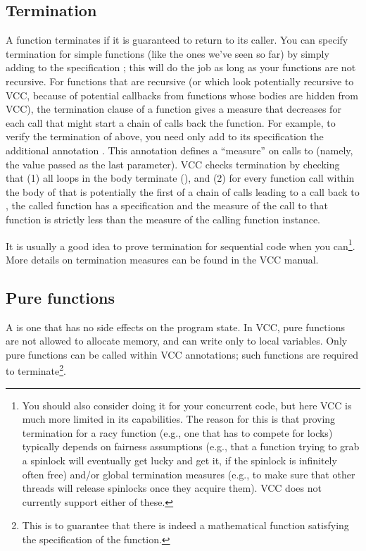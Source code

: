 \subsection{Termination}
\label{sect:termination}
A function terminates if it is guaranteed to return to its
caller. You can specify termination for simple functions (like the
ones we've seen so far) by simply adding to the specification
; this will do the job as long as your functions
are not recursive. For functions that are recursive (or which look
potentially recursive to VCC, because of potential callbacks from
functions whose bodies are hidden from VCC), the termination clause of
a function gives a measure that decreases for each call that might start
a chain of calls back the function. For example, to verify the
termination of  above, you need only add to its
specification the additional annotation . This
annotation defines a ``measure'' on calls to  (namely,
the value passed as the last parameter). VCC checks termination 
by checking that (1) all loops in the body terminate
(), and
(2) for every function call within the body of
 that is potentially the first of a chain of calls
leading to a call back to , the called function has a
 specification and the measure of the call to that
function is strictly less than the measure of the calling function
instance.  

It is usually a good idea to prove termination for sequential code
when you can\footnote{ You should also consider doing it for your
  concurrent code, but here VCC is much more limited in its
  capabilities. The reason for this is that proving termination for a
  racy function (e.g., one that has to compete for locks) typically
  depends on fairness assumptions (e.g., that a function trying to
  grab a spinlock will eventually get lucky and get it, if the
  spinlock is infinitely often free) and/or global termination
  measures (e.g., to make sure that other threads will release
  spinlocks once they acquire them). VCC does not currently support
  either of these.}.
More details on termination measures can be found in the VCC manual.

\subsection{Pure functions}
\label{sect:pureFunctions}
A  is one that has no side effects on the program
state. In VCC, pure functions are not allowed to allocate memory, and can
write only to local variables. Only pure functions can be called within VCC
annotations; such functions are required to terminate\footnote{
  This is to guarantee that there is indeed a mathematical function
  satisfying the specification of the function.
}.

